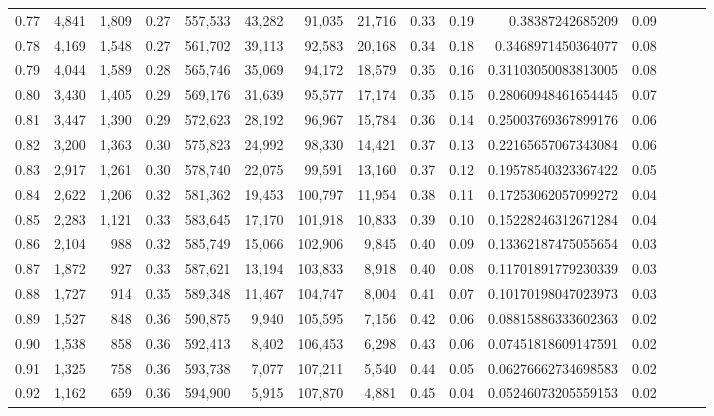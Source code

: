 \begin{tabular}{rrrrrrrrrrrrrrr}
0.77 &   4,841 &  1,809 &  0.27 &  557,533 &   43,282 &   91,035 &   21,716 &  0.33 &  0.19 &      0.38387242685209 &      0.09 \\
0.78 &   4,169 &  1,548 &  0.27 &  561,702 &   39,113 &   92,583 &   20,168 &  0.34 &  0.18 &    0.3468971450364077 &      0.08 \\
0.79 &   4,044 &  1,589 &  0.28 &  565,746 &   35,069 &   94,172 &   18,579 &  0.35 &  0.16 &   0.31103050083813005 &      0.08 \\
0.80 &   3,430 &  1,405 &  0.29 &  569,176 &   31,639 &   95,577 &   17,174 &  0.35 &  0.15 &   0.28060948461654445 &      0.07 \\
0.81 &   3,447 &  1,390 &  0.29 &  572,623 &   28,192 &   96,967 &   15,784 &  0.36 &  0.14 &   0.25003769367899176 &      0.06 \\
0.82 &   3,200 &  1,363 &  0.30 &  575,823 &   24,992 &   98,330 &   14,421 &  0.37 &  0.13 &   0.22165657067343084 &      0.06 \\
0.83 &   2,917 &  1,261 &  0.30 &  578,740 &   22,075 &   99,591 &   13,160 &  0.37 &  0.12 &   0.19578540323367422 &      0.05 \\
0.84 &   2,622 &  1,206 &  0.32 &  581,362 &   19,453 &  100,797 &   11,954 &  0.38 &  0.11 &   0.17253062057099272 &      0.04 \\
0.85 &   2,283 &  1,121 &  0.33 &  583,645 &   17,170 &  101,918 &   10,833 &  0.39 &  0.10 &   0.15228246312671284 &      0.04 \\
0.86 &   2,104 &    988 &  0.32 &  585,749 &   15,066 &  102,906 &    9,845 &  0.40 &  0.09 &   0.13362187475055654 &      0.03 \\
0.87 &   1,872 &    927 &  0.33 &  587,621 &   13,194 &  103,833 &    8,918 &  0.40 &  0.08 &   0.11701891779230339 &      0.03 \\
0.88 &   1,727 &    914 &  0.35 &  589,348 &   11,467 &  104,747 &    8,004 &  0.41 &  0.07 &   0.10170198047023973 &      0.03 \\
0.89 &   1,527 &    848 &  0.36 &  590,875 &    9,940 &  105,595 &    7,156 &  0.42 &  0.06 &   0.08815886333602363 &      0.02 \\
0.90 &   1,538 &    858 &  0.36 &  592,413 &    8,402 &  106,453 &    6,298 &  0.43 &  0.06 &   0.07451818609147591 &      0.02 \\
0.91 &   1,325 &    758 &  0.36 &  593,738 &    7,077 &  107,211 &    5,540 &  0.44 &  0.05 &   0.06276662734698583 &      0.02 \\
0.92 &   1,162 &    659 &  0.36 &  594,900 &    5,915 &  107,870 &    4,881 &  0.45 &  0.04 &   0.05246073205559153 &      0.02 \\

\end{tabular}
